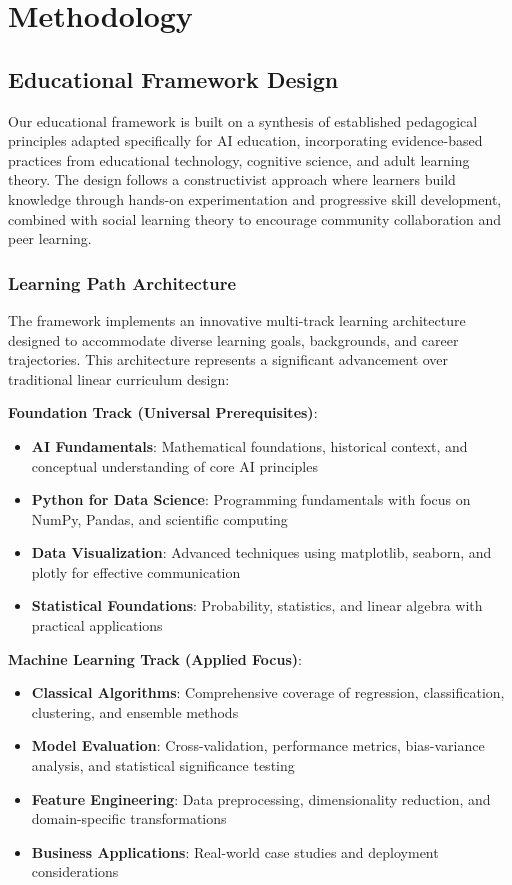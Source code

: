 \section{Methodology}
\label{sec:methodology}

\subsection{Educational Framework Design}

Our educational framework is built on a synthesis of established pedagogical principles adapted specifically for AI education, incorporating evidence-based practices from educational technology, cognitive science, and adult learning theory. The design follows a constructivist approach \cite{piaget1977equilibration} where learners build knowledge through hands-on experimentation and progressive skill development, combined with social learning theory \cite{bandura1977social} to encourage community collaboration and peer learning.

\subsubsection{Learning Path Architecture}

The framework implements an innovative multi-track learning architecture designed to accommodate diverse learning goals, backgrounds, and career trajectories. This architecture represents a significant advancement over traditional linear curriculum design:

\textbf{Foundation Track (Universal Prerequisites)}:
\begin{itemize}
    \item \textbf{AI Fundamentals}: Mathematical foundations, historical context, and conceptual understanding of core AI principles
    \item \textbf{Python for Data Science}: Programming fundamentals with focus on NumPy, Pandas, and scientific computing
    \item \textbf{Data Visualization}: Advanced techniques using matplotlib, seaborn, and plotly for effective communication
    \item \textbf{Statistical Foundations}: Probability, statistics, and linear algebra with practical applications
\end{itemize}

\textbf{Machine Learning Track (Applied Focus)}:
\begin{itemize}
    \item \textbf{Classical Algorithms}: Comprehensive coverage of regression, classification, clustering, and ensemble methods
    \item \textbf{Model Evaluation}: Cross-validation, performance metrics, bias-variance analysis, and statistical significance testing
    \item \textbf{Feature Engineering}: Data preprocessing, dimensionality reduction, and domain-specific transformations
    \item \textbf{Business Applications}: Real-world case studies and deployment considerations
\end{itemize}


